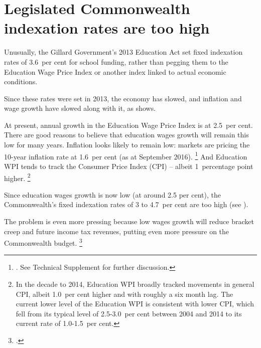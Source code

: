 \documentclass{grattan}
\begin{document}
\section{Legislated Commonwealth indexation rates are too high }\label{sec:legislated-commonwealth-indexation-rates-are-too-high}

Unusually, the Gillard Government's 2013 Education Act set fixed indexation rates of 3.6~per cent for school funding, rather than pegging them to the Education Wage Price Index or another index linked to actual economic conditions.

Since these rates were set in 2013, the economy has slowed, and inflation and wage growth have slowed along with it, as  shows.

At present, annual growth in the Education Wage Price Index is at 2.5~per cent.
There are good reasons to believe that education wages growth will remain this low for many years.
Inflation looks likely to remain low: markets are pricing the 10-year inflation rate at 1.6~per cent (as at September 2016).%
\footnote{\textcite{RBA2016G3InflationExpectations}.
See Technical Supplement for further discussion.} %
And Education WPI tends to track the Consumer Price Index (CPI) -- albeit 1~percentage point higher.%
\footnote{In the decade to 2014, Education WPI broadly tracked movements in general CPI, albeit 1.0~per cent higher and with roughly a six month lag. The current lower level of the Education WPI is consistent with lower CPI, which fell from its typical level of 2.5-3.0~per cent between 2004 and 2014 to its current rate of 1.0-1.5~per cent.}

Since education wages growth is now low (at around 2.5 per cent), the Commonwealth's fixed indexation rates of 3 to 4.7~per cent are too high (see ).

The problem is even more pressing because low wages growth will reduce bracket creep and future income tax revenues, putting even more pressure on the Commonwealth budget.%
\footnote{\textcite{Daley2015FiscalChallengesAustralia} .}
\end{document}
